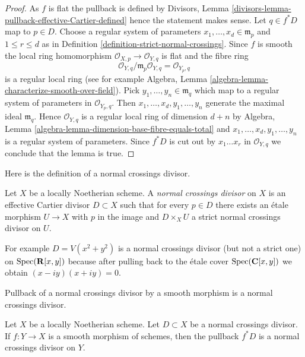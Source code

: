 \begin{proof}
As $f$ is flat the pullback is defined by
Divisors, Lemma \ref{divisors-lemma-pullback-effective-Cartier-defined}
hence the statement makes sense.
Let $q \in f^*D$ map to $p \in D$. Choose a regular system
of parameters $x_1, \ldots, x_d \in \mathfrak m_p$
and $1 \leq r \leq d$ as in
Definition \ref{definition-strict-normal-crossings}.
Since $f$ is smooth the local ring homomorphism
$\mathcal{O}_{X, p} \to \mathcal{O}_{Y, q}$ is flat
and the fibre ring
$$
\mathcal{O}_{Y, q}/\mathfrak m_p \mathcal{O}_{Y, q} =
\mathcal{O}_{Y_p, q}
$$
is a regular local ring (see for example
Algebra, Lemma \ref{algebra-lemma-characterize-smooth-over-field}).
Pick $y_1, \ldots, y_n \in \mathfrak m_q$ which map to a regular
system of parameters in $\mathcal{O}_{Y_p, q}$.
Then $x_1, \ldots, x_d, y_1, \ldots, y_n$ generate the
maximal ideal $\mathfrak m_q$. Hence $\mathcal{O}_{Y, q}$
is a regular local ring of dimension
$d + n$ by Algebra, Lemma \ref{algebra-lemma-dimension-base-fibre-equals-total}
and $x_1, \ldots, x_d, y_1, \ldots, y_n$
is a regular system of parameters. Since $f^*D$ is cut
out by $x_1 \ldots x_r$ in $\mathcal{O}_{Y, q}$ we conclude
that the lemma is true.
\end{proof}

\noindent
Here is the definition of a normal crossings divisor.

\begin{definition}
\label{definition-normal-crossings}
Let $X$ be a locally Noetherian scheme. A {\it normal crossings divisor}
on $X$ is an effective Cartier divisor $D \subset X$ such that for
every $p \in D$ there exists an \'etale morphism $U \to X$ with
$p$ in the image and $D \times_X U$ a
strict normal crossings divisor on $U$.
\end{definition}

\noindent
For example $D = V(x^2 + y^2)$ is a normal crossings divisor
(but not a strict one) on
$\mathop{\mathrm{Spec}}(\mathbf{R}[x, y])$ because after pulling back to
the \'etale cover $\mathop{\mathrm{Spec}}(\mathbf{C}[x, y])$ we obtain $(x - iy)(x + iy) = 0$.

\begin{lemma}
\label{lemma-smooth-pullback-normal-crossings}
\begin{slogan}
Pullback of a normal crossings divisor by a smooth
morphism is a normal crossings divisor.
\end{slogan}
Let $X$ be a locally Noetherian scheme. Let $D \subset X$ be a
normal crossings divisor. If $f : Y \to X$ is a smooth
morphism of schemes, then the pullback $f^*D$ is a
normal crossings divisor on $Y$.
\end{lemma}

